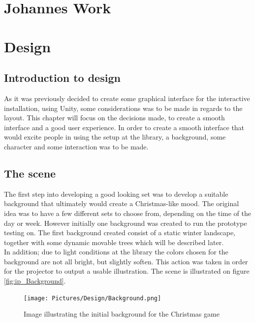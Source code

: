 \chapter{Johannes Work}
\chapter{Design}
\section{Introduction to design}
As it was previously decided to create some graphical interface for the interactive installation, using Unity, some considerations was to be made in regards to the layout. This chapter will focus on the decisions made, to create a smooth interface and a good user experience. In order to create a smooth interface that would excite people in using the setup at the library, a background, some character and some interaction was to be made.

\section{The scene}
The first step into developing a good looking set was to develop a suitable background that ultimately would create a Christmas-like mood. The original idea was to have a few different sets to choose from, depending on the time of the day or week. However initially one background was created to run the prototype testing on. The first background created consist of a static winter landscape, together with some dynamic movable trees which will be described later. \\
In addition; due to light conditions at the library the colors chosen for the background are not all bright, but slightly soften. This action was taken in order for the projector to output a usable illustration. The scene is illustrated on  figure \eqref{fig:ip_Background}.

\begin{figure}[htbp]
\centering
\texttt{[image: Pictures/Design/Background.png]}
\caption{Image illustrating the initial background for the Christmas game}
\label{fig:ip_Background}
\end{figure}

